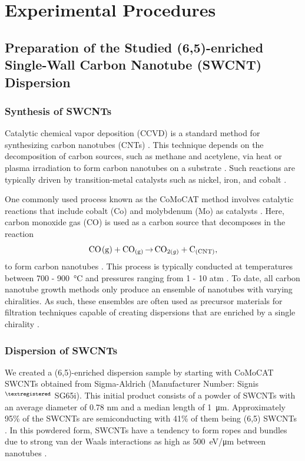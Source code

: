 \chapter{Experimental Procedures}

\section{Preparation of the Studied (6,5)-enriched Single-Wall Carbon Nanotube (SWCNT) Dispersion }

\subsection{Synthesis of SWCNTs}

Catalytic chemical vapor deposition (CCVD) is a standard method for synthesizing carbon nanotubes (CNTs) \cite{prasek2011methods, agboola2007conceptual}. This technique depends on the decomposition of carbon sources, such as methane and acetylene, via heat or plasma irradiation to form carbon nanotubes on a substrate \cite{agboola2007conceptual}. Such reactions are typically driven by transition-metal catalysts such as nickel, iron, and cobalt \cite{prasek2011methods}.

One commonly used process known as the CoMoCAT method involves catalytic reactions that include cobalt (Co) and molybdenum (Mo) as catalysts \cite{resasco2002scalable}. Here, carbon monoxide gas (CO) is used as a carbon source that decomposes in the reaction 
\vspace{-2mm}
\begin{equation}
\ce{CO_(g) + CO_{(g)} $\rightarrow$ CO_{2(g)} + C_{(CNT)}},
\end{equation}
to form carbon nanotubes \cite{resasco2002scalable}. This process is typically conducted at temperatures between 700 - \SI{900}{\celsius} and pressures ranging from 1 - 10 atm \cite{resasco2002scalable}. To date, all carbon nanotube growth methods only produce an ensemble of nanotubes with varying chiralities. As such, these ensembles are often used as precursor materials for filtration techniques capable of creating dispersions that are enriched by a single chirality \cite{ichinose2017extraction, liu2011large}.

\subsection{Dispersion of SWCNTs}
We created a (6,5)-enriched dispersion sample by starting with CoMoCAT SWCNTs obtained from Sigma-Aldrich (Manufacturer Number: Signis$^{\tiny{\textregistered}}$ SG65i). This initial product consists of a powder of SWCNTs with an average diameter of 0.78 nm and a median length of \SI{1}{\micro \meter}. Approximately 95\% of the SWCNTs are semiconducting with 41\% of them being (6,5) SWCNTs . In this powdered form, SWCNTs have a tendency to form ropes and bundles due to strong van der Waals interactions as high as \SI{500}{\electronvolt / \micro \meter} between nanotubes \cite{vaisman2006role}. 

